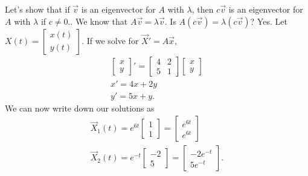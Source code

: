 Let's show that if $\vec{v}$ is an eigenvector for $A$ with $\lambda$, then $c\vec{v}$ is an eigenvector for $A$ with $\lambda$ if $c\neq 0.$. We know that $A\vec{v}=\lambda\vec{v}$. Is $A(c\vec{v})=\lambda(c\vec{v})$? Yes.
Let $X(t)=\begin{bmatrix} x(t)\\y(t) \end{bmatrix} $. If we solve for $\vec{X}'=A\vec{x}$, 
\begin{align*}
  \begin{bmatrix} x\\y \end{bmatrix} '=\begin{bmatrix} 4&2\\5&1 \end{bmatrix} \begin{bmatrix} x\\y \end{bmatrix} \\
  x'=4x+2y\\
  y'=5x+y
.\end{align*}
We can now write down our solutions as 
\begin{align*}
  \vec{X}_1(t)=e^{6t}\begin{bmatrix} 1\\1 \end{bmatrix} =\begin{bmatrix} e^{6t}\\e^{6t} \end{bmatrix} \\
  \vec{X}_2(t)=e^{-t}\begin{bmatrix} -2\\5 \end{bmatrix} =\begin{bmatrix} -2e^{-t}\\5e^{-t} \end{bmatrix} 
.\end{align*}
